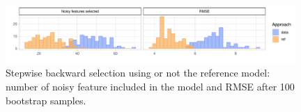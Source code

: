 \documentclass[american,]{article}
\theoremstyle{definition}
\begin{document}


\begin{figure}[tp]
  \centering
  \includegraphics[width=0.98\textwidth]{graphics/bodyfat_step_refvsdata.pdf}
  \caption{Stepwise backward selection using or not the reference model: number of noisy feature included in the model and RMSE after 100 bootstrap samples.\\}
  \label{fig:bodyfat_step_refvsdata}
\end{figure}
\end{document}
